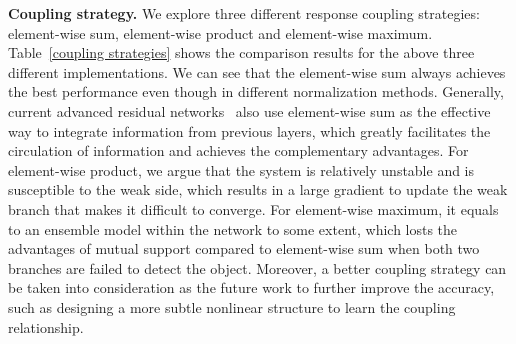 \documentclass[10pt,twocolumn,letterpaper]{article}
\begin{document}
\textbf{Coupling strategy.} We explore three different response coupling strategies: element-wise sum, element-wise product and element-wise maximum. Table~\ref{coupling strategies} shows the comparison results for the above three different implementations. We can see that the element-wise sum always achieves the best performance even though in different normalization methods. Generally, current advanced residual networks~\cite{he2016deep} also use element-wise sum as the effective way to integrate information from previous layers, which greatly facilitates the circulation of information and achieves the complementary advantages. For element-wise product, we argue that the system is relatively unstable and is susceptible to the weak side, which results in a large gradient to update the weak branch that makes it difficult to converge. For element-wise maximum, it equals to an ensemble model within the network to some extent, which losts the advantages of mutual support compared to element-wise sum when both two branches are failed to detect the object. Moreover, a better coupling strategy can be taken into consideration as the future work to further improve the accuracy, such as designing a more subtle nonlinear structure to learn the coupling relationship.

\begin{table*}[thbp]
\begin{center}
\end{center}
\caption{\textbf{Comparisons with Faster R-CNN and R-FCN using ResNet-101.} 128 samples are used for backpropagation and the top 300 proposals are selected for testing following~\cite{li2016r}. The input resolution is 600x1000. We also note that the TITAN X used here is the new Pascal architecture along with CUDA 8.0 and cuDNN-v5.1. ``07+12": VOC07 trainval union with VOC12 trainval. \textit{context}: add the context prior to assist the global branch.}
\label{comparions with Faster and RFCN}
\end{table*}
\end{document}
